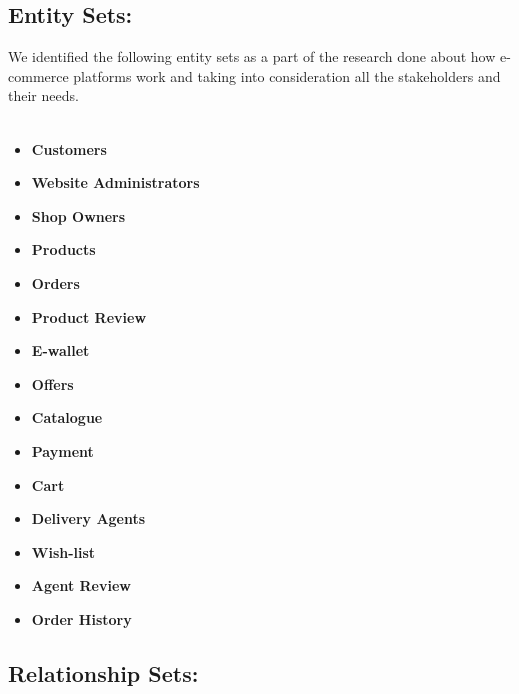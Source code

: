 \documentclass[12pt]{article}
\begin{document}
\subsection*{Entity Sets:}

We identified the following entity sets as a part of the research done about how e-commerce platforms work and taking into consideration all the stakeholders and their needs.
\\
\\
\begin{minipage}[t]{0.45\linewidth}
    \begin{itemize}
        \item \textbf{Customers}
        \item \textbf{Website Administrators}
        \item \textbf{Shop Owners}
        \item \textbf{Products}
        \item \textbf{Orders}
        \item \textbf{Product Review}
        \item \textbf{E-wallet}
        \item \textbf{Offers}
    \end{itemize}
\end{minipage}
\hfill
\begin{minipage}[t]{0.45\linewidth}
    \begin{itemize}
        \item \textbf{Catalogue}
        \item \textbf{Payment}
        \item \textbf{Cart}
        \item \textbf{Delivery Agents}
        \item \textbf{Wish-list}
        \item \textbf{Agent Review}
        \item \textbf{Order History}
    \end{itemize}
\end{minipage}


\subsection*{Relationship Sets:}
\end{document}
